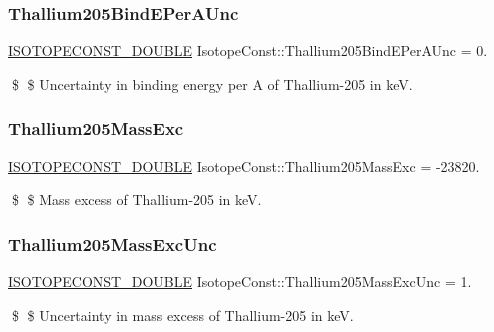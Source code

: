 \subsubsection{\texorpdfstring{Thallium205\+Bind\+E\+Per\+A\+Unc}{Thallium205BindEPerAUnc}}
{\footnotesize\ttfamily \mbox{\hyperlink{group___isotope_const-_macros_ga8f45a7272ce02c0b4c65c44636ed719a}{I\+S\+O\+T\+O\+P\+E\+C\+O\+N\+S\+T\+\_\+\+D\+O\+U\+B\+LE}} Isotope\+Const\+::\+Thallium205\+Bind\+E\+Per\+A\+Unc = 0.}

\$ \$ Uncertainty in binding energy per A of Thallium-\/205 in keV. \mbox{\label{group___isotope_const-_thallium-_tl205_ga476dc8b89e81c5d144f7c2bbdfde927f}} 
\subsubsection{\texorpdfstring{Thallium205\+Mass\+Exc}{Thallium205MassExc}}
{\footnotesize\ttfamily \mbox{\hyperlink{group___isotope_const-_macros_ga8f45a7272ce02c0b4c65c44636ed719a}{I\+S\+O\+T\+O\+P\+E\+C\+O\+N\+S\+T\+\_\+\+D\+O\+U\+B\+LE}} Isotope\+Const\+::\+Thallium205\+Mass\+Exc = -\/23820.}

\$ \$ Mass excess of Thallium-\/205 in keV. \mbox{\label{group___isotope_const-_thallium-_tl205_ga9a9efd1eebb984ebf9b1115cd96be78a}} 
\subsubsection{\texorpdfstring{Thallium205\+Mass\+Exc\+Unc}{Thallium205MassExcUnc}}
{\footnotesize\ttfamily \mbox{\hyperlink{group___isotope_const-_macros_ga8f45a7272ce02c0b4c65c44636ed719a}{I\+S\+O\+T\+O\+P\+E\+C\+O\+N\+S\+T\+\_\+\+D\+O\+U\+B\+LE}} Isotope\+Const\+::\+Thallium205\+Mass\+Exc\+Unc = 1.}

\$ \$ Uncertainty in mass excess of Thallium-\/205 in keV. \mbox{\label{group___isotope_const-_thallium-_tl205_ga104f9e4e78aa547a9fba8f290c69d0fe}} 
